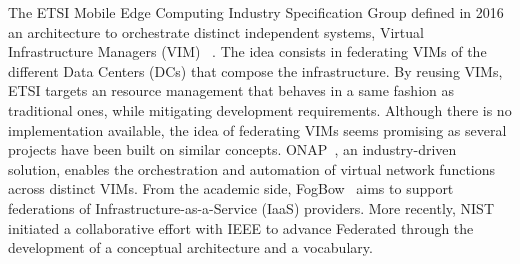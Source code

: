 



%
The ETSI Mobile Edge Computing Industry Specification Group
defined in 2016 an architecture to orchestrate distinct
independent \cloud systems, \aka Virtual
Infrastructure Managers (VIM) ~\cite{7574435}.
%
The idea consists in federating VIMs of the different Data Centers (DCs) that
compose the \edge infrastructure.  By reusing VIMs, ETSI targets an
\edgecomputing
resource management that behaves in a same fashion as traditional ones, 
while mitigating development requirements.
%
Although there is no implementation available, the idea of federating
VIMs seems promising as several projects have been built on similar
concepts. ONAP~\cite{onap}, an industry-driven solution,
enables the orchestration and automation of virtual network functions
across distinct VIMs. From the academic side, FogBow~\cite{brasileiro2016fogbow} aims to support federations
of Infrastructure-as-a-Service (IaaS) providers. More recently, NIST
initiated a collaborative effort with IEEE to advance Federated
\cloud through the development of a conceptual architecture and a
vocabulary.

